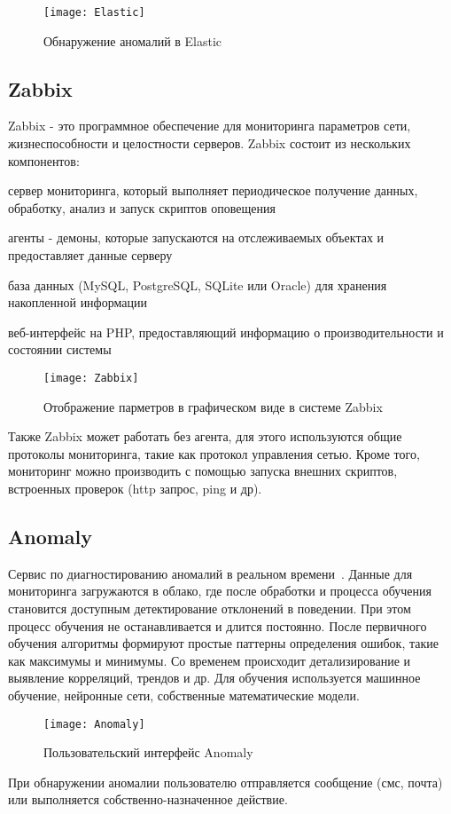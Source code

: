 \begin{figure}[htbp]
	\centering
	\texttt{[image: Elastic]}
	\caption{Обнаружение аномалий в Elastic}
	\label{fig:Elastic}
\end{figure}

\subsection{Zabbix}
Zabbix - это программное обеспечение для мониторинга параметров сети, жизнеспособности и целостности серверов. Zabbix состоит из нескольких компонентов:
\begin{itemize*}
	\item{сервер мониторинга, который выполняет периодическое получение данных, обработку, анализ и запуск скриптов оповещения}
	\item{агенты - демоны, которые запускаются на отслеживаемых объектах и предоставляет данные серверу}
	\item{база данных (MySQL, PostgreSQL, SQLite или Oracle) для хранения накопленной информации}
	\item{веб-интерфейс на PHP, предоставляющий информацию о производительности и состоянии системы}
\end{itemize*}

\begin{figure}[!htbp]
	\centering
	\texttt{[image: Zabbix]}
	\caption{Отображение парметров в графическом виде в системе Zabbix}
	\label{fig:Zabbix}
\end{figure}

Также Zabbix может работать без агента, для этого используются общие протоколы мониторинга, такие как протокол управления сетью.  Кроме того, мониторинг можно производить с помощью запуска внешних скриптов, встроенных проверок (http запрос, ping и др). 

\subsection{Anomaly} 
Сервис по диагностированию аномалий в реальном времени~\cite{Anomaly}. Данные для мониторинга загружаются в облако, где после обработки и процесса обучения становится доступным детектирование отклонений в поведении. При этом процесс обучения не останавливается и длится постоянно. После первичного обучения алгоритмы формируют простые паттерны определения ошибок, такие как максимумы и минимумы. Со временем происходит детализирование и выявление корреляций, трендов и др. Для обучения используется машинное обучение, нейронные сети, собственные математические модели. 
\begin{figure}[!h]
	\centering
	\texttt{[image: Anomaly]}
	\caption{Пользовательский интерфейс Anomaly}
	\label{fig:Anomaly}
\end{figure}
При обнаружении аномалии пользователю отправляется сообщение (смс, почта) или выполняется собственно-назначенное действие.
